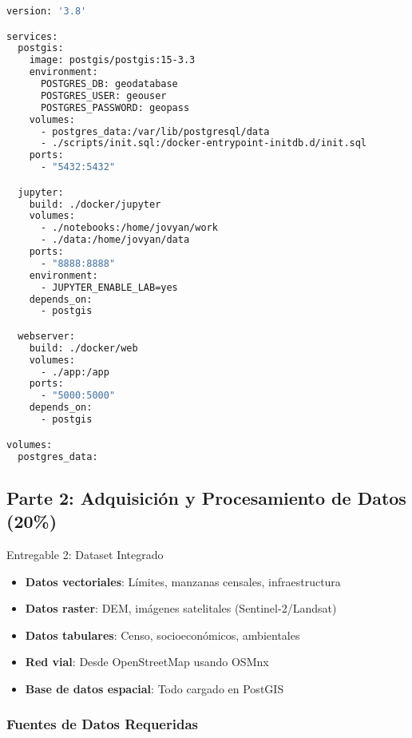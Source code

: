 \documentclass[12pt,a4paper]{article}
\begin{document}
\begin{lstlisting}[language=bash,caption=Estructura Docker Compose]
version: '3.8'

services:
  postgis:
    image: postgis/postgis:15-3.3
    environment:
      POSTGRES_DB: geodatabase
      POSTGRES_USER: geouser
      POSTGRES_PASSWORD: geopass
    volumes:
      - postgres_data:/var/lib/postgresql/data
      - ./scripts/init.sql:/docker-entrypoint-initdb.d/init.sql
    ports:
      - "5432:5432"

  jupyter:
    build: ./docker/jupyter
    volumes:
      - ./notebooks:/home/jovyan/work
      - ./data:/home/jovyan/data
    ports:
      - "8888:8888"
    environment:
      - JUPYTER_ENABLE_LAB=yes
    depends_on:
      - postgis

  webserver:
    build: ./docker/web
    volumes:
      - ./app:/app
    ports:
      - "5000:5000"
    depends_on:
      - postgis

volumes:
  postgres_data:
\end{lstlisting}

\subsection{Parte 2: Adquisición y Procesamiento de Datos (20\%)}

\begin{deliverable}{Entregable 2: Dataset Integrado}
\begin{itemize}
    \item \textbf{Datos vectoriales}: Límites, manzanas censales, infraestructura
    \item \textbf{Datos raster}: DEM, imágenes satelitales (Sentinel-2/Landsat)
    \item \textbf{Datos tabulares}: Censo, socioeconómicos, ambientales
    \item \textbf{Red vial}: Desde OpenStreetMap usando OSMnx
    \item \textbf{Base de datos espacial}: Todo cargado en PostGIS
\end{itemize}
\end{deliverable}

\subsubsection{Fuentes de Datos Requeridas}
\end{document}
